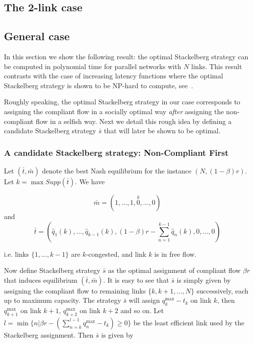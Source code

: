 \subsection{The 2-link case}


\subsection{General case}
In this section we show the following result: the optimal Stackelberg strategy can be computed in polynomial time for parallel networks with $N$ links. This result contrasts with the case of increasing latency functions where the optimal Stackelberg strategy is shown to be NP-hard to compute, see~\cite{rou01}.

\bigskip
Roughly speaking, the optimal Stackelberg strategy in our case corresponds to assigning the compliant flow in a socially optimal way \emph{after} assigning the non-compliant flow in a selfish way. Next we detail this rough idea by defining a candidate Stackelberg strategy $\bar{s}$ that will later be shown to be optimal.

\subsubsection{A candidate Stackelberg strategy: Non-Compliant First}
Let $(\bar{t}, \bar{m})$ denote the best Nash equilibrium for the instance $(N, (1-\beta)r)$. Let $k = \max Supp(\bar{t})$. We have

\[
\bar{m} = (1, \dots, 1, \stackrel{k}{0}, \dots, 0)
\]
and
\[
\bar{t} = \left( 
\hat{q}_1(k), \dots, \hat{q}_{k - 1}(k), 
(1 - \beta)r - \sum_{n = 1}^{k - 1} \hat{q}_n(k), 
0, \dots, 0 \right)
\]

i.e. links $\{1, \dots, k-1 \}$ are $k$-congested, and link $k$ is in free flow.

Now define Stackelberg strategy $\bar{s}$ as the optimal assignment of compliant flow $\beta r$ that induces equilibrium $(\bar{t}, \bar{m})$. It is easy to see that $\bar{s}$ is simply given by assigning the compliant flow to remaining links $\{k, k + 1, \dots, N\}$ successively, each up to maximum capacity. 
The strategy $\bar{s}$ will assign $q^{\max}_{k} - t_{k}$ on link $k$, then $q_{k + 1}^{\max}$ on link $k + 1$, $q_{k+2}^{\max}$ on link $k+2$ and so on.
Let $l = \min \{n | \beta r - (\sum_{n = k}^{l-1}q^{\max}_n - t_{k}) \geq 0 \}$ be the least efficient link used by the Stackelberg assignment. Then $\bar{s}$ is given by

